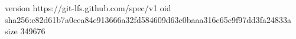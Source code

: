 version https://git-lfs.github.com/spec/v1
oid sha256:c82d61b7a0cea84e913666a32fd584609d63c0baaa316c65c9f97dd3fa24833a
size 349676

